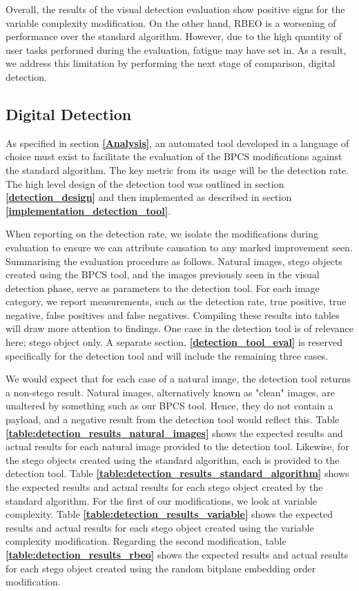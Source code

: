 \documentclass{l4proj}
\begin{document}
Overall, the results of the visual detection evaluation show positive signs for the variable complexity modification. On the other hand, RBEO is a worsening of performance over the standard algorithm. However, due to the high quantity of user tasks performed during the evaluation, fatigue may have set in. As a result, we address this limitation by performing the next stage of comparison, digital detection.

\subsection{Digital Detection}\label{digital_detection}

As specified in section \textbf{\ref{Analysis}}, an automated tool developed in a language of choice must exist to facilitate the evaluation of the BPCS modifications against the standard algorithm. The key metric from its usage will be the detection rate. The high level design of the detection tool was outlined in section \textbf{\ref{detection_design}} and then implemented as described in section \textbf{\ref{implementation_detection_tool}}. 

When reporting on the detection rate, we isolate the modifications during evaluation to ensure we can attribute causation to any marked improvement seen. Summarising the evaluation procedure as follows. Natural images, stego objects created using the BPCS tool, and the images previously seen in the visual detection phase, serve as parameters to the detection tool.  For each image category, we report measurements, such as the detection rate, true positive, true negative, false positives and false negatives. Compiling these results into tables will draw more attention to findings. One case in the detection tool is of relevance here; stego object only. A separate section, \textbf{\ref{detection_tool_eval}} is reserved specifically for the detection tool and will include the remaining three cases.

We would expect that for each case of a natural image, the detection tool returns a non-stego result. Natural images, alternatively known as "clean" images, are unaltered by something such as our BPCS tool. Hence, they do not contain a payload, and a negative result from the detection tool would reflect this. Table \textbf{\ref{table:detection_results_natural_images}} shows the expected results and actual results for each natural image provided to the detection tool. Likewise, for the stego objects created using the standard algorithm, each is provided to the detection tool. Table \textbf{\ref{table:detection_results_standard_algorithm}} shows the expected results and actual results for each stego object created by the standard algorithm. For the first of our modifications, we look at variable complexity. Table \textbf{\ref{table:detection_results_variable}} shows the expected results and actual results for each stego object created using the variable complexity modification. Regarding the second modification, table \textbf{\ref{table:detection_results_rbeo}} shows the expected results and actual results for each stego object created using the random bitplane embedding order modification.
\end{document}
